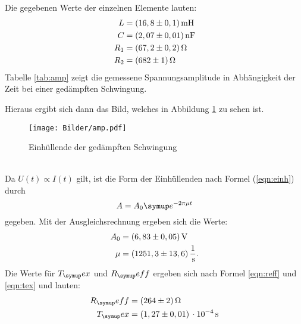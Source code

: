 Die gegebenen Werte der einzelnen Elemente lauten:
\begin{align*}
  L &= (16,8 \pm 0,1) \,\si{\milli\henry} \\
  C &= (2,07 \pm 0,01) \,\si{\nano\farad} \\
  R_1 &= (67,2 \pm 0,2) \Ohm \\
  R_2 &= (682 \pm 1) \Ohm
\end{align*}
Tabelle \ref{tab:amp} zeigt die gemessene Spannungsamplitude in Abhängigkeit der Zeit bei
einer gedämpften Schwingung.

Hieraus ergibt sich dann das Bild, welches in Abbildung \ref{fig:AMP} zu sehen ist.
\begin{figure}[h]
  \centering
  \texttt{[image: Bilder/amp.pdf]}
  \caption{Einhüllende der gedämpften Schwingung}
  \label{fig:AMP}
\end{figure}
\\
Da $U(t)\propto I(t)$ gilt, ist die Form der Einhüllenden nach Formel
(\ref{eqn:einh}) durch
\begin{equation}
  A = A_0\su{e}^{-2\pi\mu t}
\end{equation}
gegeben.
Mit der Ausgleichsrechnung ergeben sich die Werte:
\begin{align*}
  A_0 &= (6,83 \pm 0,05)\,\si{\volt}\\
  \mu &= (1251,3 \pm 13,6)\,\frac{1}{\,\si{\second}}.
\end{align*}
Die Werte für $T_\su{ex}$ und $R_\su{eff}$ ergeben sich nach Formel \eqref{eqn:reff}
und \eqref{eqn:tex} und lauten:
\begin{align*}
  R_\su{eff} &= (264 \pm 2)\Ohm \\ %
  T_\su{ex}  &= (1,27 \pm 0,01)\,\cdot 10^{-4}\sek
\end{align*}

